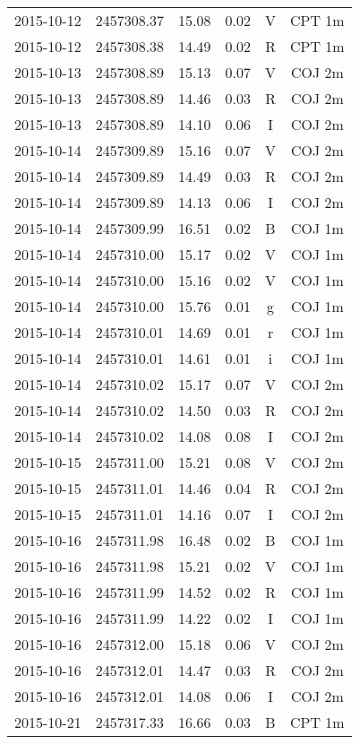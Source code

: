 \begin{table}
\begin{tabular}{cccccc}
2015-10-12 & 2457308.37 & 15.08 & 0.02 & V & CPT 1m \\
2015-10-12 & 2457308.38 & 14.49 & 0.02 & R & CPT 1m \\
2015-10-13 & 2457308.89 & 15.13 & 0.07 & V & COJ 2m \\
2015-10-13 & 2457308.89 & 14.46 & 0.03 & R & COJ 2m \\
2015-10-13 & 2457308.89 & 14.10 & 0.06 & I & COJ 2m \\
2015-10-14 & 2457309.89 & 15.16 & 0.07 & V & COJ 2m \\
2015-10-14 & 2457309.89 & 14.49 & 0.03 & R & COJ 2m \\
2015-10-14 & 2457309.89 & 14.13 & 0.06 & I & COJ 2m \\
2015-10-14 & 2457309.99 & 16.51 & 0.02 & B & COJ 1m \\
2015-10-14 & 2457310.00 & 15.17 & 0.02 & V & COJ 1m \\
2015-10-14 & 2457310.00 & 15.16 & 0.02 & V & COJ 1m \\
2015-10-14 & 2457310.00 & 15.76 & 0.01 & g & COJ 1m \\
2015-10-14 & 2457310.01 & 14.69 & 0.01 & r & COJ 1m \\
2015-10-14 & 2457310.01 & 14.61 & 0.01 & i & COJ 1m \\
2015-10-14 & 2457310.02 & 15.17 & 0.07 & V & COJ 2m \\
2015-10-14 & 2457310.02 & 14.50 & 0.03 & R & COJ 2m \\
2015-10-14 & 2457310.02 & 14.08 & 0.08 & I & COJ 2m \\
2015-10-15 & 2457311.00 & 15.21 & 0.08 & V & COJ 2m \\
2015-10-15 & 2457311.01 & 14.46 & 0.04 & R & COJ 2m \\
2015-10-15 & 2457311.01 & 14.16 & 0.07 & I & COJ 2m \\
2015-10-16 & 2457311.98 & 16.48 & 0.02 & B & COJ 1m \\
2015-10-16 & 2457311.98 & 15.21 & 0.02 & V & COJ 1m \\
2015-10-16 & 2457311.99 & 14.52 & 0.02 & R & COJ 1m \\
2015-10-16 & 2457311.99 & 14.22 & 0.02 & I & COJ 1m \\
2015-10-16 & 2457312.00 & 15.18 & 0.06 & V & COJ 2m \\
2015-10-16 & 2457312.01 & 14.47 & 0.03 & R & COJ 2m \\
2015-10-16 & 2457312.01 & 14.08 & 0.06 & I & COJ 2m \\
2015-10-21 & 2457317.33 & 16.66 & 0.03 & B & CPT 1m \\

\end{tabular}
\end{table}
